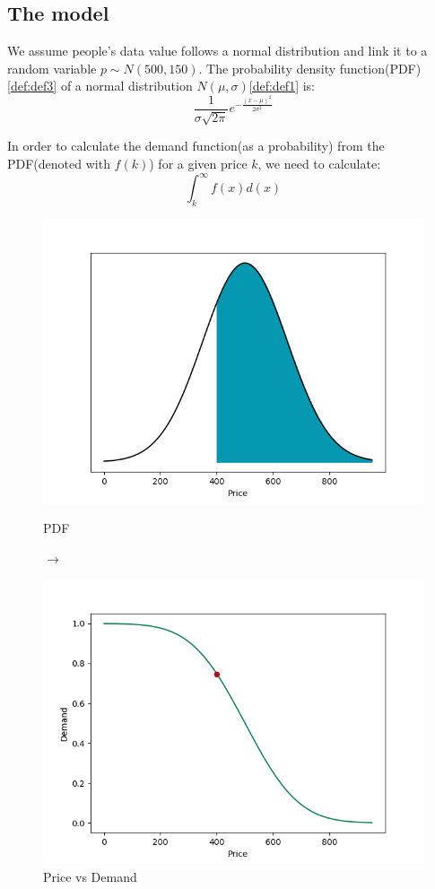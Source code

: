 \documentclass[11pt, a4paper]{article}
\begin{document}
	\subsection{The model}
		We assume people's data value follows a normal distribution and link it to a random variable $p\sim N(500, 150)$. The probability density function(PDF)\ref{def:def3} of a normal distribution $N(\mu, \sigma)$\ref{def:def1} is: $$\frac{1}{\sigma\sqrt{2\pi}}e^{-\frac{(x-\mu)^{2}}{2\sigma^{2}}}$$\par\noindent
		In order to calculate the demand function(as a probability) from the PDF(denoted with $f(k)$) for a given price $k$, we need to calculate:
		$$\int_{k}^{\infty}f(x)d(x)$$
		\begin{figure}[h]
			\begin{minipage}{0.48\textwidth}
				\centering
				\includegraphics[width=\linewidth]{ND_integral}
				\caption{PDF}\label{Fig:Data1}
			\end{minipage}$\longrightarrow$
			\begin{minipage}{0.48\textwidth}
				\centering
				\includegraphics[width=\linewidth]{Sample_point}
				\caption{Price vs Demand}\label{Fig:Data2}
			\end{minipage}
		\end{figure}\par\noindent
\end{document}
